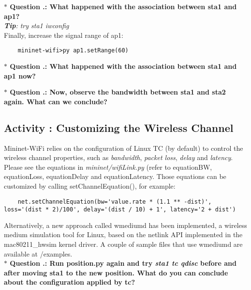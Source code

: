 \noindent \textbf{$\ast$ Question \themycounter.\thequestion{}: What happened with the association between sta1 and ap1?}
\\\textit{\textbf{Tip}: try sta1 iwconfig}
\\

\noindent Finally, increase the signal range of ap1:
\begin{verbatim}
    mininet-wifi>py ap1.setRange(60)
\end{verbatim}


\noindent \textbf{$\ast$ Question \themycounter.\thequestion{}: What happened with the association between sta1 and ap1 now?}

\noindent \textbf{$\ast$ Question \themycounter.\thequestion{}: Now, observe the bandwidth between sta1 and sta2 again. 
What can we conclude?  }


\setcounter{question}{1}
\subsection{Activity \themycounter{}: Customizing the Wireless Channel}
	
Mininet-WiFi relies on the configuration of Linux TC (by default) to
control the wireless channel properties, such as \textit{bandwidth}, \textit{packet loss}, \textit{delay} and \textit{latency}. Please see the equations in \textit{mininet/wifiLink.py} (refer to equationBW, equationLoss, equationDelay and equationLatency. Those equations can be customized by calling setChannelEquation(), for example:

\begin{verbatim}
    net.setChannelEquation(bw='value.rate * (1.1 ** -dist)', loss='(dist * 2)/100', delay='(dist / 10) + 1', latency='2 + dist')
\end{verbatim}

Alternatively, a new approach called wmediumd has been implemented, a wireless medium simulation tool for Linux, based on the netlink API implemented in the mac80211\_hwsim kernel driver. A couple of sample files that use wmediumd are available at /examples.\\

\noindent \textbf{$\ast$ Question \themycounter.\thequestion{}: Run position.py again and try \textit{sta1 tc qdisc} before and after moving sta1 to the new position. What do you can conclude about the configuration applied by tc?}
\\


